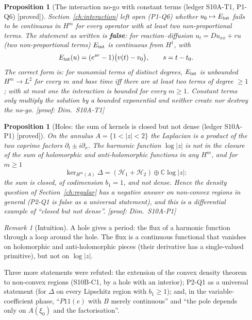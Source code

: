 \documentclass[11pt]{article}
\theoremstyle{plain}
\newtheorem{proposition}[theorem]{Proposition}
\theoremstyle{definition}
\theoremstyle{remark}
\newtheorem{remark}[theorem]{Remark}
\newcommand{\C}{\mathbb{C}}
\newcommand{\badge}[2]{\textcolor{#1}{\textsf{\footnotesize[#2]}}}
\newcommand{\proved}[1][]{\badge{cC}{proved#1}}
\newcommand{\led}[1]{\textcolor{cG}{\textsf{\footnotesize(ledger #1)}}}
\newenvironment{intuition}{\begin{remark}[Intuition]}{\end{remark}}
\newcommand{\dimref}[1]{\textsf{\footnotesize[proof: Dim.~#1]}}
\begin{document}
\begin{proposition}[{The interaction no-go with constant terms \led{S10A-T1, P1-Q6} \proved}]\label{thm:s10at1}
Section~\ref{ch:interaction} left open (P1-Q6) whether $u_0\mapsto E_{\rm int}$ fails to be continuous in $H^m$ for every operator with at least two non-proportional terms. The statement as written is \textbf{false}: for reaction--diffusion $u_t=Du_{xx}+ru$ (two non-proportional terms) $E_{\rm int}$ is continuous from $H^1$, with
\[
E_{\rm int}(u)=(e^{sr}-1)\big(v(t)-v_0\big),\qquad s=t-t_0 .
\]
The correct form is: for monomial terms of distinct degrees, $E_{\rm int}$ is unbounded $H^m\to L^2$ for every $m$ and base time iff there are \emph{at least two terms of degree $\ge1$}; with at most one the interaction is bounded for every $m\ge1$. Constant terms only multiply the solution by a bounded exponential and neither create nor destroy the no-go.
\dimref{S10A-T1}
\end{proposition}

\begin{proposition}[{Holes: the sum of kernels is closed but not dense \led{S10A-P1} \proved}]\label{prop:s10ap1}
On the annulus $A=\{1<|z|<2\}$ the Laplacian is a product of the two coprime factors $\partial_t\pm i\partial_x$. The harmonic function $\log|z|$ is not in the closure of the sum of holomorphic and anti-holomorphic functions in any $H^m$, and for $m\ge1$
\[
\ker_{H^m(A)}\Delta=(\mathcal H_1+\mathcal H_2)\oplus\C\log|z| :
\]
the sum is closed, of codimension $b_1=1$, and not dense. Hence the density question of Section~\ref{ch:regular} has a negative answer on non-convex regions in general (P2-Q1 is false as a universal statement), and this is a \emph{differential} example of ``closed but not dense''.
\dimref{S10A-P1}
\end{proposition}

\begin{intuition}
A hole gives a period: the flux of a harmonic function through a loop around the hole. The flux is a continuous functional that vanishes on holomorphic and anti-holomorphic pieces (their derivative has a single-valued primitive), but not on $\log|z|$.
\end{intuition}

Three more statements were refuted: the extension of the convex density theorem to non-convex regions (S10B-C1, by a hole with an interior); P2-Q1 as a universal statement (for $\Delta$ on every Lipschitz region with $b_1\ge1$); and, in the variable-coefficient phase, ``$P11(e)$ with $B$ merely continuous'' and ``the pole depends only on $A(\xi_0)$ and the factorisation''.
\end{document}
